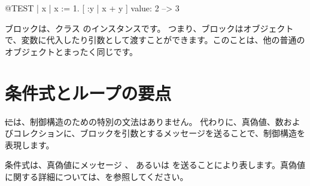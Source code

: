 \documentclass[a4paper,10pt,twoside]{book}
\begin{document}
\begin{code}{@TEST}
| x |
x := 1.
[ :y | x + y ] value: 2 --> 3
\end{code}

ブロックは、クラス  のインスタンスです。
つまり、ブロックはオブジェクトで、変数に代入したり引数として渡すことができます。このことは、他の普通のオブジェクトとまったく同じです。






\section{条件式とループの要点}

\st には、制御構造のための特別の文法はありません。
代わりに、真偽値、数およびコレクションに、ブロックを引数とするメッセージを送ることで、制御構造を表現します。

条件式は、真偽値にメッセージ 、 あるいは  を送ることにより表します。真偽値に関する詳細については、を参照してください。
\end{document}
